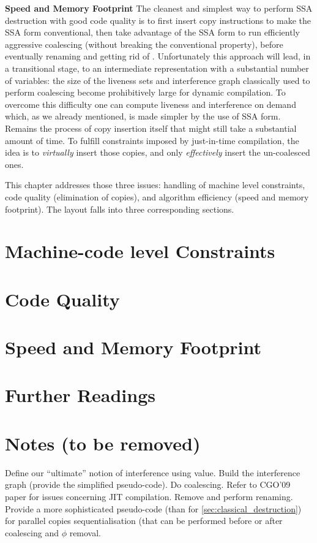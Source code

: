 {\bf Speed and Memory Footprint} 
The cleanest and simplest way to perform SSA destruction with good code quality is to first insert copy instructions to make the SSA form conventional, then take advantage of the SSA form to run efficiently aggressive coalescing (without breaking the conventional property), before eventually renaming \phiwebs\index{\phiweb} and getting rid of \phifuns. Unfortunately this approach will lead, in a transitional stage, to an intermediate representation with a substantial number of variables: the size of the liveness sets and interference graph classically used to perform coalescing become prohibitively large for dynamic compilation. To overcome this difficulty one can compute liveness and interference on demand which, as we already mentioned, is made simpler by the use of SSA form. Remains the process of copy insertion itself that might still take a substantial amount of time. To fulfill constraints imposed by just-in-time compilation, the idea is to \emph{virtually} insert those copies, and only \emph{effectively} insert the un-coalesced ones.    

This chapter addresses those three issues: handling of machine level constraints, code quality (elimination of copies), and algorithm efficiency (speed and memory footprint). The layout falls into three corresponding sections.

\section{Machine-code level Constraints}
\section{Code Quality}
\section{Speed and Memory Footprint}
\section{Further Readings}

\section{Notes (to be removed)}

Define our ``ultimate'' notion of interference using value. Build the interference graph (provide the simplified pseudo-code). Do coalescing. Refer to CGO'09 paper for issues concerning JIT compilation. Remove \phifuns and perform renaming. Provide a more sophisticated pseudo-code (than for \ref{sec:classical_destruction}) for parallel copies sequentialisation (that can be performed before or after coalescing and $\phi$ removal.

